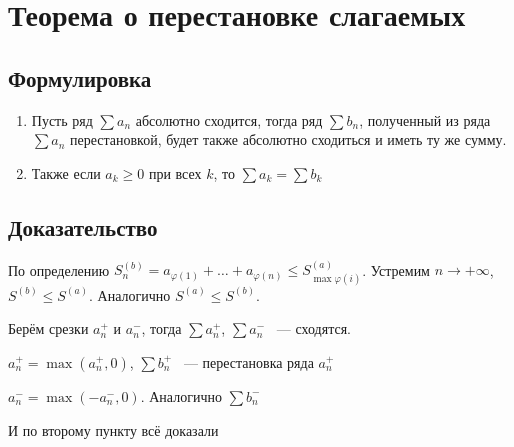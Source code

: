 \documentclass{article}
\begin{document}
    \newpage
    
    \section{Теорема о перестановке слагаемых}
    
        \subsection{Формулировка}
        
            \begin{enumerate}
            
                \item Пусть ряд $\sum a_n$ абсолютно сходится, тогда ряд $\sum b_n$, полученный из ряда $\sum a_n$ перестановкой, будет также абсолютно сходиться и иметь ту же сумму.
            
                \item Также если $a_k \geq 0$ при всех $k$, то $\sum a_k = \sum b_k$
                
            \end{enumerate}
            
        \subsection{Доказательство}
        
            \begin{etaremune}
            
                \item По определению $S_n^{(b)} = a_{\varphi(1)} + \ldots + a_{\varphi(n)} \leq S^{(a)}_{\max \varphi(i)}$. Устремим $n \rightarrow +\infty$, $S^{(b)} \leq S^{(a)}$. Аналогично $S^{(a)} \leq S^{(b)}$. 
            
                \item Берём срезки $a_n^+$ и $a_n^-$, тогда $\sum a_n^+$, $\sum a_n^-$ ~--- сходятся.
            
                    $a^+_n = \max(a^+_n, 0)$, $\sum b^+_n$ ~--- перестановка ряда $a^+_n$
            
                    $a^-_n = \max(-a^-_n, 0)$. Аналогично $\sum b^-_n$
                
                    И по второму пункту всё доказали
                    
            \end{etaremune}
            
\end{document}
